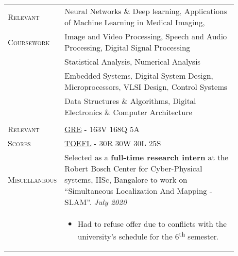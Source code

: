 \documentclass[letterpaper, 10pt, oneside]{article}
\newcommand{\stitle}[1]{\normalsize{\textsc{#1}}}
\begin{document}
\begin{longtable}{@{} p{0.14\linewidth} p{0.8\linewidth}}
    \stitle{Relevant}    & Neural Networks \& Deep learning, Applications of Machine Learning in Medical Imaging,                                                                                                                            \\
    \stitle{Coursework}  & Image and Video Processing, Speech and Audio Processing, Digital Signal Processing                                                                                                                                \\
                         & Statistical Analysis, Numerical Analysis                                                                                                                                                                          \\
                         & Embedded Systems, Digital System Design, Microprocessors, VLSI Design, Control Systems                                                                                                                            \\
                         & Data Structures \& Algorithms, Digital Electronics \& Computer Architecture                                                                                                                                       \\
    \\[-1ex]

    \stitle{Relevant}
                         & \href{https://drive.google.com/file/d/1GcdXmPTWR-6tKUgB92V8pG8GVn-ng_6C}{GRE} - 163V 168Q 5A
    \\
    \stitle{Scores}      & \href{https://drive.google.com/file/d/1lHDbt59e9o1LFKb_HhWiVbzITH7avB6j}{TOEFL} - 30R 30W 30L 25S
    \\[1ex]


    \stitle{Miscellaneous}
                         & Selected as a \textbf{full-time research intern} at the
    Robert Bosch Center for Cyber-Physical systems, IISc, Bangalore to work on
    ``Simultaneous Localization And Mapping - SLAM''.
    \hfill \textsl{July 2020}                                                                                                                                                                                                                \\
                         & \parbox{0.8\textwidth}{                                                                                                                                                                                           %
        \begin{itemize}[leftmargin=6ex, itemsep=-0.88ex, topsep=-0.88ex]
            \item Had to refuse offer due to conflicts with the university's schedule for the 6\textsuperscript{th} semester.
        \end{itemize}
    }
    \\[1.5ex]


\end{longtable}
\end{document}
